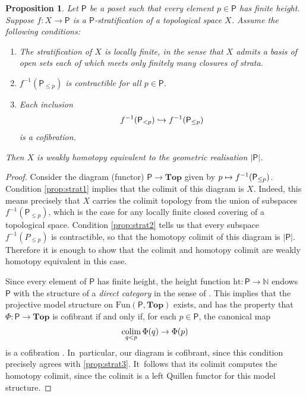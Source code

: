 \documentclass[JEP,XML,SOM,Unicode,NoFloatCountersInSection,published]{cedram}
\newcommand\mto{\mathchoice{\longmapsto}{\mapsto}{\mapsto}{\mapsto}}
\newcommand\hto{\mathrel{\lhook\joinrel\to}}
\theoremstyle{plain}
\newtheorem{prop}[thm]{Proposition}
\theoremstyle{definition}
\newcommand{\Po}{\mathsf{P}}
\newcommand{\Ht}{{\mathrm{ht}}}
\begin{document}
\begin{prop}\label{prop:strat}
Let $\Po$ be a poset such that every element $p \in \Po$ has finite height. Suppose $f \colon X \to \Po$ is a $\Po$-stratification of a topological space $X$. Assume the following conditions:
\begin{enumerate}
\item\label{prop:strat1} The stratification of $X$ is locally finite, in the sense that $X$ admits a basis of open sets each of which meets only finitely many closures of strata.
\item\label{prop:strat2} $f^{-1}(\Po_{\leq p})$ is contractible for all $p \in \Po$.
\item\label{prop:strat3} Each inclusion
\[
f^{-1}(\Po_{<p}) \hto f^{-1}(\Po_{\leq p})
\]
is a cofibration.
\end{enumerate}
Then $X$ is weakly homotopy equivalent to the geometric realisation $|\Po|$.
\end{prop}

\begin{proof}
Consider the diagram (\ie functor) $\Po \to \mathbf{Top}$ given by $p \mto f^{-1}(\Po_{\leq p})$. Condition \eqref{prop:strat1} implies that the colimit of this diagram is $X$. Indeed, this means precisely that $X$ carries the colimit topology from the union of subspaces $f^{-1}(\Po_{\leq p})$, which is the case for any locally finite closed covering of a topological space. Condition \eqref{prop:strat2} tells us that every subspace $f^{-1}(P_{\leq p})$ is contractible, so that the homotopy colimit of this diagram is $|\Po|$. Therefore it is enough to show that the colimit and homotopy colimit are weakly homotopy equivalent in this case.

Since every element of $\Po$ has finite height, the height function $\Ht \colon \Po \to \mathbb{N}$ endows~$\Po$ with the structure of a \emph{direct category} in the sense of \cite[\S5.1]{hovey}. This implies that the projective model structure on $\mathrm{Fun}(\Po,\mathbf{Top})$ exists, and has the property that $\Phi :\Po \to \mathbf{Top}$ is cofibrant if and only if, for each $p \in \Po$, the canonical map\vspace*{-3pt}
\[
\operatornamewithlimits{colim}_{q<p} \Phi(q) \to \Phi(p)
\]
is a cofibration \cite[Th.\,5.1.3]{hovey}. In~particular, our diagram is cofibrant, since this condition precisely agrees with \eqref{prop:strat3}. It~follows that its colimit computes the homotopy colimit, since the colimit is a left Quillen functor for this model structure.\end{proof}
\end{document}
